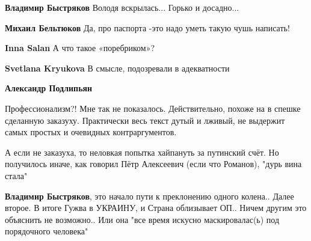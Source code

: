 \begin{itemize}
\begin{itemize}
\textbf{Владимир Быстряков} Володя вскрылась... Горько и досадно...

 
\textbf{Михаил Бельтюков} Да, про паспорта -это надо уметь такую чушь написать!

 
\textbf{Inna Salan} А что такое «поребриком»?

 
\textbf{Svetlana Kryukova} В смысле, подозревали в адекватности

 
\textbf{Александр Подлипьян} 

Профессионализм?! Мне так не показалось. Действительно, похоже на в спешке
сделанную заказуху. Практически весь текст дутый и лживый, не выдержит самых
простых и очевидных контраргументов.

А если не заказуха, то неловкая попытка хайпануть за путинский счёт. Но
получилось иначе, как говорил Пётр Алексеевич (если что Романов), "дурь вина
стала"

 
\textbf{Владимир Быстряков}, это начало пути к преклонению одного колена.. Далее второе. В итоге Гужва в УКРАИНУ, и Страна облизывает ОП.. Ничем другим это объяснить не возможно.. Или она "все время искусно маскировалас(ь) под порядочного человека"

 

\end{itemize}
\end{itemize}
